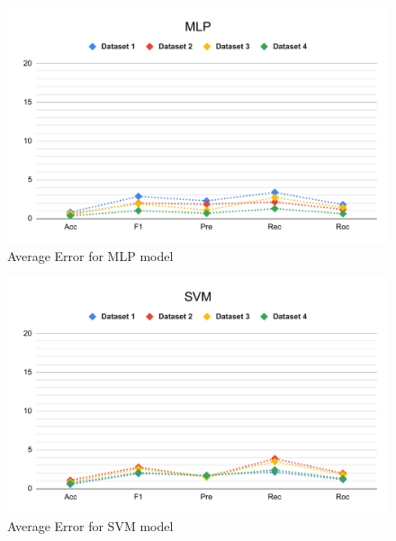 \begin{figure}[ht]
    \centering
    \includegraphics[width=1.9\columnwidth]{media/ch_result_and_testing/delta_MLP.pdf}
    \caption{Average Error for MLP model} \label{fig:perfromance_delta_mlp}
\end{figure}

\begin{figure}[ht]
    \centering
    \includegraphics[width=1.9\columnwidth]{media/ch_result_and_testing/delta_SVM.pdf}
    \caption{Average Error for SVM model} \label{fig:perfromance_delta_svm}
\end{figure}
